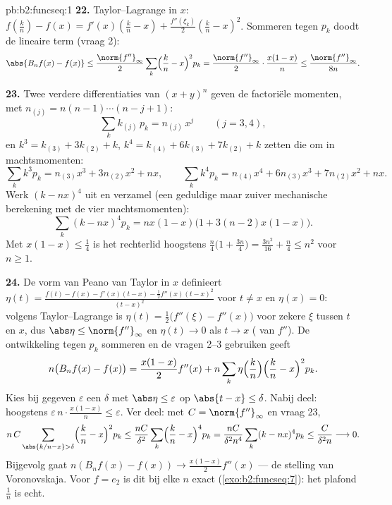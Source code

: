 \begin{solution}{pb:b2:funcseq:1}
\textbf{22.} Taylor--Lagrange in $x$: $f(\frac kn) - f(x) =
f'(x)(\frac kn - x) + \frac{f''(\xi_k)}2(\frac kn - x)^2$.
Sommeren tegen $p_k$ doodt de lineaire term (vraag 2):
\[
\abs{B_nf(x) - f(x)}
\leq \frac{\norm{f''}_\infty}{2}\sum_k\Bigl(\frac kn -
x\Bigr)^2p_k
= \frac{\norm{f''}_\infty}{2}\cdot\frac{x(1-x)}{n}
\leq \frac{\norm{f''}_\infty}{8n} .
\]

\textbf{23.} Twee verdere differentiaties van $(x+y)^n$ geven de
factoriële momenten, met $n_{(j)} = n(n-1)\cdots(n-j+1)$:
\[
\sum_k k_{(j)}\,p_k = n_{(j)}\,x^j \qquad (j = 3, 4),
\]
en $k^3 = k_{(3)} + 3k_{(2)} + k$, $k^4 = k_{(4)} + 6k_{(3)} +
7k_{(2)} + k$ zetten die om in machtsmomenten:
\[
\sum_k k^3p_k = n_{(3)}x^3 + 3n_{(2)}x^2 + nx,
\qquad
\sum_k k^4p_k = n_{(4)}x^4 + 6n_{(3)}x^3 + 7n_{(2)}x^2 + nx .
\]
Werk $(k - nx)^4$ uit en verzamel (een geduldige maar zuiver
mechanische berekening met de vier machtsmomenten):
\[
\sum_k(k-nx)^4p_k = nx(1-x)\bigl(1 + 3(n-2)x(1-x)\bigr) .
\]
Met $x(1-x) \leq \frac14$ is het rechterlid hoogstens
$\frac n4\bigl(1 + \frac{3n}4\bigr) = \frac{3n^2}{16} + \frac n4
\leq n^2$ voor $n \geq 1$.

\textbf{24.} De vorm van Peano van Taylor in $x$ definieert
$\eta(t) = \frac{f(t) - f(x) - f'(x)(t-x) -
\frac12f''(x)(t-x)^2} {(t-x)^2}$ voor $t \neq x$ en $\eta(x) = 0$:
volgens Taylor--Lagrange is $\eta(t) = \frac12\bigl(f''(\xi) -
f''(x)\bigr)$ voor zekere $\xi$ tussen $t$ en $x$, dus $\abs\eta
\leq \norm{f''}_\infty$ en $\eta(t) \to 0$ als $t \to x$
( van $f''$). De ontwikkeling tegen $p_k$ sommeren en
de vragen 2--3 gebruiken geeft
\[
n\bigl(B_nf(x) - f(x)\bigr)
= \frac{x(1-x)}{2}f''(x)
+ n\sum_k\eta\Bigl(\frac kn\Bigr)\Bigl(\frac kn -
x\Bigr)^2p_k .
\]
Kies bij gegeven $\varepsilon$ een $\delta$ met $\abs\eta \leq
\varepsilon$ op $\abs{t - x}\leq\delta$. Nabij deel: hoogstens
$\varepsilon\,n\cdot\frac{x(1-x)}n \leq \varepsilon$. Ver deel: met
$C = \norm{f''}_\infty$ en vraag 23,
\[
n\,C\sum_{\abs{k/n-x}>\delta}\Bigl(\frac kn -
x\Bigr)^2p_k
\leq \frac{nC}{\delta^2}\sum_k\Bigl(\frac kn -
x\Bigr)^4p_k
= \frac{nC}{\delta^2 n^4}\sum_k(k-nx)^4p_k
\leq \frac{C}{\delta^2 n} \longrightarrow 0 .
\]
Bijgevolg gaat $n(B_nf(x) - f(x)) \to \frac{x(1-x)}2f''(x)$ --- de
stelling van Voronovskaja. Voor $f = e_2$ is dit bij elke $n$ exact
(\cref{exo:b2:funcseq:7}): het plafond $\frac1n$ is echt.


\end{solution}
